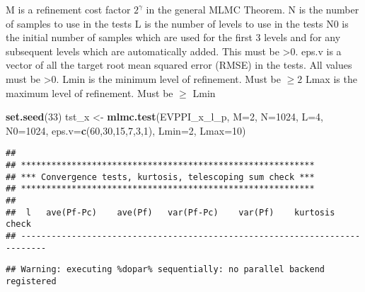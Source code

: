 \documentclass[
]{article}
\newenvironment{Shaded}{\begin{snugshade}}{\end{snugshade}}
\newcommand{\DataTypeTok}[1]{\textcolor[rgb]{0.13,0.29,0.53}{#1}}
\newcommand{\DecValTok}[1]{\textcolor[rgb]{0.00,0.00,0.81}{#1}}
\newcommand{\KeywordTok}[1]{\textcolor[rgb]{0.13,0.29,0.53}{\textbf{#1}}}
\newcommand{\NormalTok}[1]{#1}
\newcommand{\StringTok}[1]{\textcolor[rgb]{0.31,0.60,0.02}{#1}}
\begin{document}
M is a refinement cost factor \(2^{\gamma}\) in the general MLMC
Theorem. N is the number of samples to use in the tests L is the number
of levels to use in the tests N0 is the initial number of samples which
are used for the first 3 levels and for any subsequent levels which are
automatically added. This must be \textgreater0. eps.v is a vector of
all the target root mean squared error (RMSE) in the tests. All values
must be \textgreater0. Lmin is the minimum level of refinement. Must be
\(\ge 2\) Lmax is the maximum level of refinement. Must be \(\ge\) Lmin

\begin{Shaded}
\begin{Highlighting}[]
\KeywordTok{set.seed}\NormalTok{(}\DecValTok{33}\NormalTok{)}
\NormalTok{tst_x <-}\StringTok{ }\KeywordTok{mlmc.test}\NormalTok{(EVPPI_x_l_p, }\DataTypeTok{M=}\DecValTok{2}\NormalTok{, }\DataTypeTok{N=}\DecValTok{1024}\NormalTok{,}
                          \DataTypeTok{L=}\DecValTok{4}\NormalTok{, }\DataTypeTok{N0=}\DecValTok{1024}\NormalTok{,}
                          \DataTypeTok{eps.v=}\KeywordTok{c}\NormalTok{(}\DecValTok{60}\NormalTok{,}\DecValTok{30}\NormalTok{,}\DecValTok{15}\NormalTok{,}\DecValTok{7}\NormalTok{,}\DecValTok{3}\NormalTok{,}\DecValTok{1}\NormalTok{),}
                          \DataTypeTok{Lmin=}\DecValTok{2}\NormalTok{, }\DataTypeTok{Lmax=}\DecValTok{10}\NormalTok{)}
\end{Highlighting}
\end{Shaded}

\begin{verbatim}
## 
## **********************************************************
## *** Convergence tests, kurtosis, telescoping sum check ***
## **********************************************************
## 
##  l   ave(Pf-Pc)    ave(Pf)   var(Pf-Pc)    var(Pf)    kurtosis     check 
## ---------------------------------------------------------------------------
\end{verbatim}

\begin{verbatim}
## Warning: executing %dopar% sequentially: no parallel backend registered
\end{verbatim}
\end{document}
